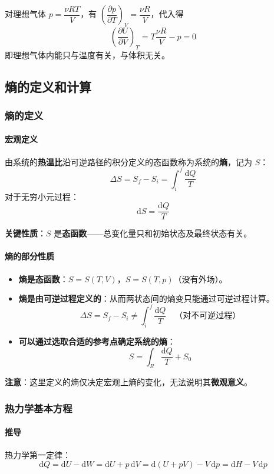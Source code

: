 \documentclass[UTF8]{ctexart}
\begin{document}
对理想气体 $p=\dfrac{\nu RT}{V}$，有 $\left(\dfrac{\partial p}{\partial T}\right)_V=\dfrac{\nu R}{V}$，代入得
\[
\left(\frac{\partial U}{\partial V}\right)_T=T\frac{\nu R}{V}-p=0
\]
即理想气体内能只与温度有关，与体积无关。


\subsection{熵的定义和计算}

\subsubsection{熵的定义}

\paragraph{宏观定义}
由系统的\textbf{热温比}沿可逆路径的积分定义的态函数称为系统的\textbf{熵}，记为 $S$：
\[
\boxed{\Delta S=S_f-S_i=\int_i^f\frac{\mathrm{d}Q}{T}}
\]
对于无穷小元过程：
\[
\boxed{\mathrm{d}S=\frac{\mathrm{d}Q}{T}}
\]

\textbf{关键性质}：$S$ 是\textbf{态函数}——总变化量只和初始状态及最终状态有关。

\paragraph{熵的部分性质}
\begin{itemize}[leftmargin=2em]
  \item \textbf{熵是态函数}：$S=S(T,V)$，$S=S(T,p)$（没有外场）。
  \item \textbf{熵是由可逆过程定义的}：从而两状态间的熵变只能通过可逆过程计算。
  \[
  \Delta S=S_f-S_i\neq\int_i^f\frac{\mathrm{d}Q}{T}\quad\text{（对不可逆过程）}
  \]
  \item \textbf{可以通过选取合适的参考点确定系统的熵}：
  \[
  S=\int_R\frac{\mathrm{d}Q}{T}+S_0
  \]
\end{itemize}

\textbf{注意}：这里定义的熵仅决定宏观上熵的变化，无法说明其\textbf{微观意义}。

\subsubsection{热力学基本方程}

\paragraph{推导}
热力学第一定律：
\[
\mathrm{d}Q=\mathrm{d}U-\mathrm{d}W=\mathrm{d}U+p\,\mathrm{d}V
=\mathrm{d}(U+pV)-V\,\mathrm{d}p=\mathrm{d}H-V\,\mathrm{d}p
\]
\end{document}
